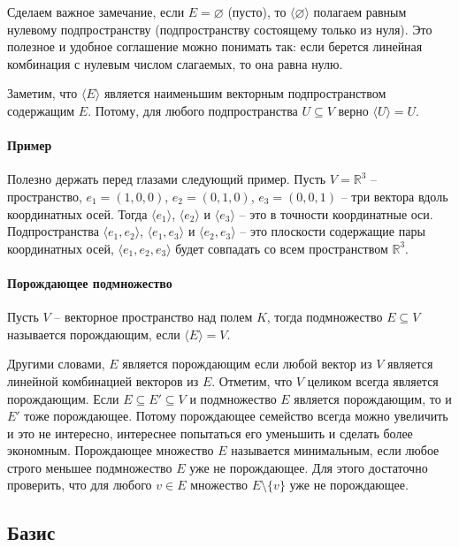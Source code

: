 Сделаем важное замечание, если $E = \varnothing$ (пусто), то $\langle \varnothing \rangle$ полагаем равным нулевому подпространству (подпространству состоящему только из нуля).
Это полезное и удобное соглашение можно понимать так: если берется линейная комбинация с нулевым числом слагаемых, то она равна нулю.

Заметим, что $\langle E \rangle$ является наименьшим векторным подпространством содержащим $E$.
Потому, для любого подпространства $U\subseteq V$ верно $\langle U \rangle  = U$.

\paragraph{Пример}

Полезно держать перед глазами следующий пример.
Пусть $V = \mathbb R^3$ -- пространство, $e_1 =(1,0,0)$, $e_2 = (0,1,0)$, $e_3 = (0,0,1)$ -- три вектора вдоль координатных осей.
Тогда $\langle e_1\rangle$, $\langle e_2\rangle$ и $\langle e_3\rangle$ -- это в точности координатные оси.
Подпространства $\langle e_1, e_2\rangle$, $\langle e_1, e_3\rangle$ и $\langle e_2, e_3\rangle$ -- это плоскости содержащие пары координатных осей, $\langle e_1, e_2, e_3\rangle$ будет совпадать со всем пространством $\mathbb R^3$.

\paragraph{Порождающее подмножество}

\begin{definition}
Пусть $V$ -- векторное пространство над полем $K$, тогда подмножество $E\subseteq V$ называется порождающим, если $\langle E \rangle  = V$.
\end{definition}

Другими словами, $E$ является порождающим если любой вектор из $V$ является линейной комбинацией векторов из $E$.
Отметим, что $V$ целиком всегда является порождающим.
Если $E\subseteq E'\subseteq V$ и подмножество $E$ является порождающим, то и $E'$ тоже порождающее.
Потому порождающее семейство всегда можно увеличить и это не интересно, интереснее попытаться его уменьшить и сделать более экономным.
Порождающее множество $E$ называется минимальным, если любое строго меньшее подмножество $E$ уже не порождающее.
Для этого достаточно проверить, что для любого $v\in E$ множество $E\setminus \{v\}$ уже не порождающее.


\subsection{Базис}

